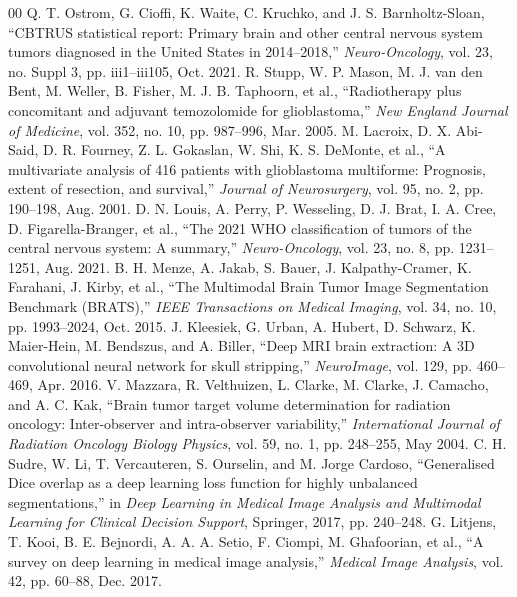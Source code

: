 \documentclass[conference]{IEEEtran}
\begin{document}
\begin{thebibliography}{00}
 Q. T. Ostrom, G. Cioffi, K. Waite, C. Kruchko, and J. S. Barnholtz-Sloan, ``CBTRUS statistical report: Primary brain and other central nervous system tumors diagnosed in the United States in 2014--2018,'' \emph{Neuro-Oncology}, vol. 23, no. Suppl 3, pp. iii1--iii105, Oct. 2021.
 R. Stupp, W. P. Mason, M. J. van den Bent, M. Weller, B. Fisher, M. J. B. Taphoorn, et al., ``Radiotherapy plus concomitant and adjuvant temozolomide for glioblastoma,'' \emph{New England Journal of Medicine}, vol. 352, no. 10, pp. 987--996, Mar. 2005.
 M. Lacroix, D. X. Abi-Said, D. R. Fourney, Z. L. Gokaslan, W. Shi, K. S. DeMonte, et al., ``A multivariate analysis of 416 patients with glioblastoma multiforme: Prognosis, extent of resection, and survival,'' \emph{Journal of Neurosurgery}, vol. 95, no. 2, pp. 190--198, Aug. 2001.
 D. N. Louis, A. Perry, P. Wesseling, D. J. Brat, I. A. Cree, D. Figarella-Branger, et al., ``The 2021 WHO classification of tumors of the central nervous system: A summary,'' \emph{Neuro-Oncology}, vol. 23, no. 8, pp. 1231--1251, Aug. 2021.
 B. H. Menze, A. Jakab, S. Bauer, J. Kalpathy-Cramer, K. Farahani, J. Kirby, et al., ``The Multimodal Brain Tumor Image Segmentation Benchmark (BRATS),'' \emph{IEEE Transactions on Medical Imaging}, vol. 34, no. 10, pp. 1993--2024, Oct. 2015.
 J. Kleesiek, G. Urban, A. Hubert, D. Schwarz, K. Maier-Hein, M. Bendszus, and A. Biller, ``Deep MRI brain extraction: A 3D convolutional neural network for skull stripping,'' \emph{NeuroImage}, vol. 129, pp. 460--469, Apr. 2016.
 V. Mazzara, R. Velthuizen, L. Clarke, M. Clarke, J. Camacho, and A. C. Kak, ``Brain tumor target volume determination for radiation oncology: Inter-observer and intra-observer variability,'' \emph{International Journal of Radiation Oncology Biology Physics}, vol. 59, no. 1, pp. 248--255, May 2004.
 C. H. Sudre, W. Li, T. Vercauteren, S. Ourselin, and M. Jorge Cardoso, ``Generalised Dice overlap as a deep learning loss function for highly unbalanced segmentations,'' in \emph{Deep Learning in Medical Image Analysis and Multimodal Learning for Clinical Decision Support}, Springer, 2017, pp. 240--248.
 G. Litjens, T. Kooi, B. E. Bejnordi, A. A. A. Setio, F. Ciompi, M. Ghafoorian, et al., ``A survey on deep learning in medical image analysis,'' \emph{Medical Image Analysis}, vol. 42, pp. 60--88, Dec. 2017.

\end{thebibliography}
\end{document}
